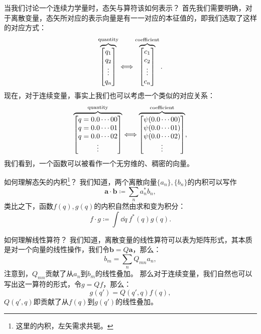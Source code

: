 \begin{tcolorbox}[breakable, colframe=purple, colback=red!10, title={\textbf{关于连续力学量的算符}}]
当我们讨论一个连续力学量时，态矢与算符该如何表示？
首先我们需要明确，对于离散变量，态矢所对应的表示向量是有一一对应的本征值的，即我们选取了这样的对应方式：
\begin{equation}
    \overbrace{
    \begin{bmatrix}
        q_1 \\ q_2 \\ \vdots \\ q_n
    \end{bmatrix}}^{\rm{quantity}}
    \Longleftrightarrow
    \overbrace{
    \begin{bmatrix}
        c_1 \\ c_2 \\ \vdots \\ c_n
    \end{bmatrix}}^{\rm{coefficient}}.
\end{equation}
现在，对于连续变量，事实上我们也可以考虑一个类似的对应关系：
\begin{equation}
    \overbrace{
    \begin{bmatrix}
        q=0.0 \cdots 00 \\ q=0.0 \cdots 01 \\ q=0.0 \cdots 02 \\ \vdots
    \end{bmatrix}}^{\rm{quantity}}
    \Longleftrightarrow
    \overbrace{
    \begin{bmatrix}
        \psi(0.0 \cdots 00) \\ \psi(0.0 \cdots 01) \\ \psi(0.0 \cdots 02) \\ \vdots
    \end{bmatrix}}^{\rm{coefficient}},
\end{equation}
我们看到，一个函数可以被看作一个无穷维的、稠密的向量。

如何理解态矢的内积\footnote{这里的内积，左矢需求共轭。}？
我们知道，两个离散向量$\{a_n\},\{b_n\}$的内积可以写作
\begin{equation}
    \bm{a}\cdot\bm{b} \coloneq \sum_n a_n^* b_n,
\end{equation}
类比之下，函数$f(q), g(q)$的内积自然由求和变为积分：
\begin{equation}
    f \cdot g \coloneq \int \dd q\ f^*(q) g(q).
\end{equation}

如何理解线性算符？
我们知道，离散变量的线性算符可以表为矩阵形式，其本质是对一个向量的线性操作，我们令$\bm{b}=Q\bm{a}$，那么：
\begin{equation}
    b_m = \sum_n Q_{mn} a_n,
\end{equation}
注意到，$Q_{mn}$贡献了从$a_n$到$b_m$的线性叠加。
那么对于连续变量，我们自然也可以写出这一算符的形式，令$g=Qf$，那么：
\begin{equation}
    \label{eq:cmr_operator_cont}
    g(q') = Q(q',q) f(q),
\end{equation}
$Q(q',q)$即贡献了从$f(q)$到$g(q')$的线性叠加。


\end{tcolorbox}
